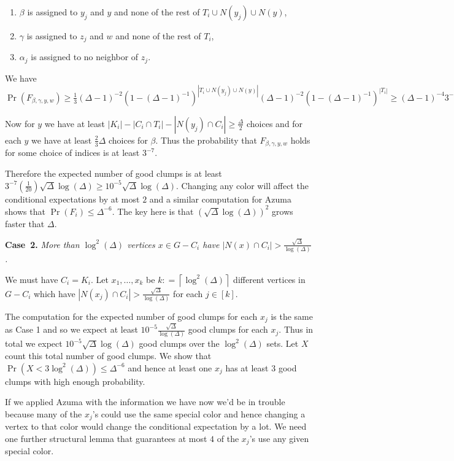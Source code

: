 \documentclass[12pt]{amsart}
\theoremstyle{plain}
\theoremstyle{definition}
\theoremstyle{remark}
\newcommand{\card}[1]{\left|#1\right|}
\newcommand{\ceil}[1]{\left\lceil#1\right\rceil}
\newcommand{\irange}[1]{\left[#1\right]}
\newcommand{\DefinedAs}{\mathrel{\mathop:}=}
\begin{document}
\begin{enumerate}
  \item $\beta$ is assigned to $y_j$ and $y$ and none of the rest of $T_i \cup
  N(y_j) \cup N(y)$,
  \item $\gamma$ is assigned to $z_j$ and $w$ and none of the rest of $T_i$,
  \item $\alpha_j$ is assigned to no neighbor of $z_j$.
\end{enumerate}

We have $\Pr(F_{\beta, \gamma, y, w}) \geq
\frac13 (\Delta-1)^{-2}(1-(\Delta-1)^{-1})^{\card{T_i \cup
N(y_j) \cup N(y)}}(\Delta-1)^{-2}(1 - (\Delta-1)^{-1})^{\card{T_i}} \geq
(\Delta-1)^{-4}3^{-5}.$

Now for $y$ we have at least $\card{K_i} - \card{C_i \cap T_i} - \card{N(y_j)
\cap C_i} \geq \frac{\Delta}{2}$ choices and for each $y$ we have at least
$\frac23 \Delta$ choices for $\beta$. Thus the probability that $F_{\beta,
\gamma, y, w}$ holds for some choice of indices is at least $3^{-7}$.

\bigskip

Therefore the expected number of good clumps is at least $3^{-7}
(\frac{1}{20})\sqrt{\Delta}\log(\Delta) \geq 10^{-5} \sqrt{\Delta}\log(\Delta)$.   
Changing any color will affect the conditional expectations by at most $2$ and a
similar computation for Azuma shows that $\Pr(F_i) \leq \Delta^{-6}$.  The key
here is that $(\sqrt{\Delta}\log(\Delta))^2$ grows faster that $\Delta$.

{\bf Case~2.} {\it More than $\log^2(\Delta)$ vertices $x \in G  - C_i$ have
$\card{N(x) \cap C_i} > \frac{\sqrt{\Delta}}{\log(\Delta)}$.}

We must have $C_i = K_i$.  Let $x_1, \ldots, x_k$ be $k \DefinedAs
\ceil{\log^2(\Delta)}$ different vertices in $G - C_i$ which have $\card{N(x_j)
\cap C_i} > \frac{\sqrt{\Delta}}{\log(\Delta)}$ for each $j \in \irange{k}$.  

The computation for the expected number of good clumps for each $x_j$ is the
same as Case 1 and so we expect at least
$10^{-5}\frac{\sqrt{\Delta}}{\log(\Delta)}$ good clumps for each $x_j$.  Thus in
total we expect $10^{-5}\sqrt{\Delta}\log(\Delta)$ good clumps over the
$\log^2(\Delta)$ sets.  Let $X$ count this total number of good clumps.  We show
that $\Pr(X < 3\log^2(\Delta)) \leq \Delta^{-6}$ and hence at least one $x_j$
has at least $3$ good clumps with high enough probability.

If we applied Azuma with the information we have now we'd be in trouble because
many of the $x_j$'s could use the same special color and hence changing a vertex
to that color would change the conditional expectation by a lot.  We need one
further structural lemma that guarantees at most $4$ of the $x_j$'s use any
given special color.
\end{document}
